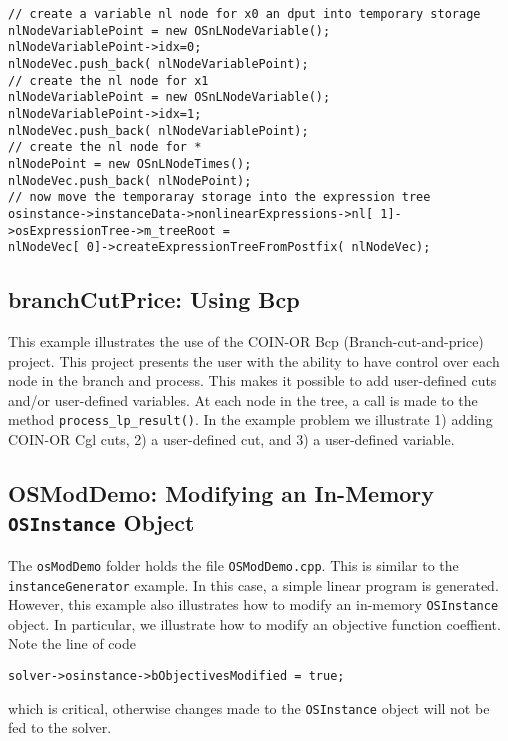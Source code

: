 \documentclass[11pt]{article}
\renewcommand{\{}{{\char"7B}}
\renewcommand{\}}{{\char"7D}}
\renewcommand{\^}{{\char"0D}}
\renewcommand{\'}{{\char"0D}}
\begin{document}
\begin{verbatim}
// create a variable nl node for x0 an dput into temporary storage
nlNodeVariablePoint = new OSnLNodeVariable();
nlNodeVariablePoint->idx=0;
nlNodeVec.push_back( nlNodeVariablePoint);
// create the nl node for x1
nlNodeVariablePoint = new OSnLNodeVariable();
nlNodeVariablePoint->idx=1;
nlNodeVec.push_back( nlNodeVariablePoint);
// create the nl node for *
nlNodePoint = new OSnLNodeTimes();
nlNodeVec.push_back( nlNodePoint);
// now move the temporaray storage into the expression tree
osinstance->instanceData->nonlinearExpressions->nl[ 1]->osExpressionTree->m_treeRoot =
nlNodeVec[ 0]->createExpressionTreeFromPostfix( nlNodeVec);
\end{verbatim}





\subsection{branchCutPrice:  Using Bcp}\label{section:examplebranchCutPrice}

This example illustrates the use of the COIN-OR Bcp (Branch-cut-and-price) project.  
This project presents the user with the ability to have control over each node in the branch and process. 
This makes it possible to add user-defined cuts and/or user-defined variables. 
At each node in the tree, a call is made to the method {\tt process\_lp\_result()}. 
In the example problem we illustrate 1) adding COIN-OR Cgl cuts, 2) a user-defined cut, 
and 3) a user-defined variable. 


\subsection{OSModDemo: Modifying an In-Memory {\tt OSInstance} Object}\label{section:exampleOSModDemo}

The {\tt osModDemo} folder holds the file {\tt OSModDemo.cpp}. This is similar to the 
{\tt instanceGenerator} example. In this case, a simple linear program is generated. However, 
this example also illustrates how to modify an in-memory {\tt OSInstance} object. 
In particular, we illustrate how to modify an objective function coeffient. Note the line of code 

\begin{verbatim}
solver->osinstance->bObjectivesModified = true;
\end{verbatim}
which is critical, otherwise changes made to the {\tt OSInstance} object will not be fed to the solver. 
\end{document}
